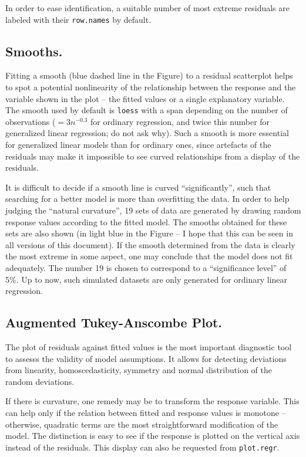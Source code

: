 \documentclass{article}
\providecommand{\T}{\texttt}
\begin{document}
In order to ease identification, a suitable number of most extreme
residuals are labeled with their \T{row.names} by default.

\subsection{Smooths.}
Fitting a smooth (blue dashed line in the Figure) 
to a residual scatterplot helps to spot a potential
nonlinearity of the relationship between the response and the variable
shown in the plot -- the fitted values or a single explanatory variable.
The smooth used by default is \T{loess} with a span depending on the number
of observations ($= 3n^{-0.3}$ for ordinary regression, and twice this
number for generalized linear regression; do not ask why).
Such a smooth is more essential for generalized linear models than for 
ordinary ones, since artefacts of the residuals may make it impossible to 
see curved relationships from a display of the residuals.

It is difficult to decide if a smooth line is curved ``significantly'',
such that searching for a better model is more than overfitting the data.
In order to help judging the ``natural curvature'', 19 sets of data are
generated by drawing random response values according to the fitted model.
The smooths obtained for these sets are also shown (in light blue in the
Figure -- I hope that this can be seen in all versions of this document).
If the smooth determined from the data is clearly the most extreme in some
aspect, one may conclude that the model does not fit adequately.
The number 19 is chosen to correspond to a ``significance level'' of 5\%.
Up to now, such simulated datasets are only generated for ordinary linear
regression. 

\subsection{Augmented Tukey-Anscombe Plot.}
The plot of residuals against fitted values is the most important
diagnostic tool to assesss the validity of model assumptions.
It allows for detecting deviations from linearity, homoscedasticity,
symmetry and normal distribution of the random deviations.

If there is curvature, one remedy may be to transform the response
variable. This can help only if the relation between fitted and
response values is monotone -- otherwise, quadratic terms are the
most straightforward modification of the model.
The distinction is easy to see if the response is plotted on the vertical
axis instead of the residuals.
This display can also be requested from \T{plot.regr}.
\end{document}
